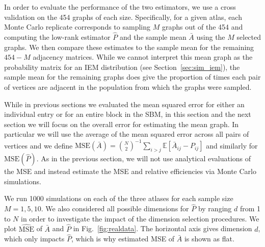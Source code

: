\documentclass[10pt,letterpaper]{article}
\newcommand{\Ex}{\mathbb{E}}
\renewcommand{\hat}{\widehat}
\begin{document}
In order to evaluate the performance of the two estimators, we use a cross validation on the 454 graphs of each size. 
Specifically, for a given atlas, each Monte Carlo replicate corresponds to sampling $M$ graphs out of the 454 and computing the low-rank estimator $\hat{P}$ and the sample mean $\bar{A}$ using the $M$ selected graphs. 
We then compare these estimates to the sample mean for the remaining $454-M$ adjacency matrices.
While we cannot interpret this mean graph as the probability matrix for an IEM distribution (see Section~\ref{sec:sim_iem}), the sample mean for the remaining graphs does give the proportion of times each pair of vertices are adjacent in the population from which the graphs were sampled.

While in previous sections we evaluated the mean squared error for either an individual entry or for an entire block in the SBM, in this section and the next section we will focus on the overall error for estimating the mean graph.
In particular we will use the average of the mean squared error across all pairs of vertices and we define $\mathrm{MSE}(\bar{A}) = \binom{N}{2}^{-1} \sum_{i>j}\Ex[\bar{A}_{ij}-P_{ij}]$ and similarly for $\mathrm{MSE}(\hat{P})$.
As in the previous section, we will not use analytical evaluations of the MSE and instead estimate the MSE and relative efficiencies via Monte Carlo simulations.

We run 1000 simulations on each of the three atlases for each sample size $M=1,5,10$.
We also considered all possible dimensions for $\hat{P}$ by ranging $d$ from 1 to $N$ in order to investigate the impact of the dimension selection procedures.
We plot $\hat{\mathrm{MSE}}$ of $\bar{A}$ and $\hat{P}$ in Fig.~\ref{fig:realdata}.
The horizontal axis gives dimension $d$, which only impacts $\hat{P}$, which is why estimated MSE of $\bar{A}$ is shown as flat.
\end{document}

